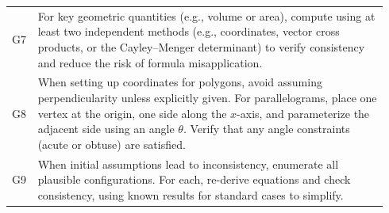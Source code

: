 \documentclass{article}
\theoremstyle{plain}
\theoremstyle{definition}
\theoremstyle{remark}
\begin{document}
\begin{table}[h]
\begin{tabular}{p{0.04\linewidth} p{0.9\linewidth}}
G7 & For key geometric quantities (e.g., volume or area), compute using at least two independent methods (e.g., coordinates, vector cross products, or the Cayley--Menger determinant) to verify consistency and reduce the risk of formula misapplication. \\

G8 & When setting up coordinates for polygons, avoid assuming perpendicularity unless explicitly given. For parallelograms, place one vertex at the origin, one side along the \(x\)-axis, and parameterize the adjacent side using an angle \(\theta\). Verify that any angle constraints (acute or obtuse) are satisfied. \\

G9 & When initial assumptions lead to inconsistency, enumerate all plausible configurations. For each, re-derive equations and check consistency, using known results for standard cases to simplify. \\
\bottomrule
\end{tabular}
\end{table}
\end{document}
